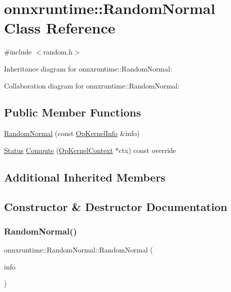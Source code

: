 \hypertarget{classonnxruntime_1_1RandomNormal}{}\section{onnxruntime\+:\+:Random\+Normal Class Reference}
\label{classonnxruntime_1_1RandomNormal}


{\ttfamily \#include $<$random.\+h$>$}



Inheritance diagram for onnxruntime\+:\+:Random\+Normal\+:


Collaboration diagram for onnxruntime\+:\+:Random\+Normal\+:
\subsection*{Public Member Functions}
\begin{DoxyCompactItemize}
\item 
\mbox{\hyperlink{classonnxruntime_1_1RandomNormal_a388fd995c3513741d4e6226d44bbfec0}{Random\+Normal}} (const \mbox{\hyperlink{classonnxruntime_1_1OpKernelInfo}{Op\+Kernel\+Info}} \&info)
\item 
\mbox{\hyperlink{classonnxruntime_1_1common_1_1Status}{Status}} \mbox{\hyperlink{classonnxruntime_1_1RandomNormal_acf11676d882e0d210fdb973d75995159}{Compute}} (\mbox{\hyperlink{classonnxruntime_1_1OpKernelContext}{Op\+Kernel\+Context}} $\ast$ctx) const override
\end{DoxyCompactItemize}
\subsection*{Additional Inherited Members}


\subsection{Constructor \& Destructor Documentation}
\mbox{\label{classonnxruntime_1_1RandomNormal_a388fd995c3513741d4e6226d44bbfec0}} 
\subsubsection{\texorpdfstring{Random\+Normal()}{RandomNormal()}}
{\footnotesize\ttfamily onnxruntime\+::\+Random\+Normal\+::\+Random\+Normal (\begin{DoxyParamCaption}\item[{const \mbox{\hyperlink{classonnxruntime_1_1OpKernelInfo}{Op\+Kernel\+Info}} \&}]{info }\end{DoxyParamCaption})\hspace{0.3cm}{\ttfamily [inline]}}



